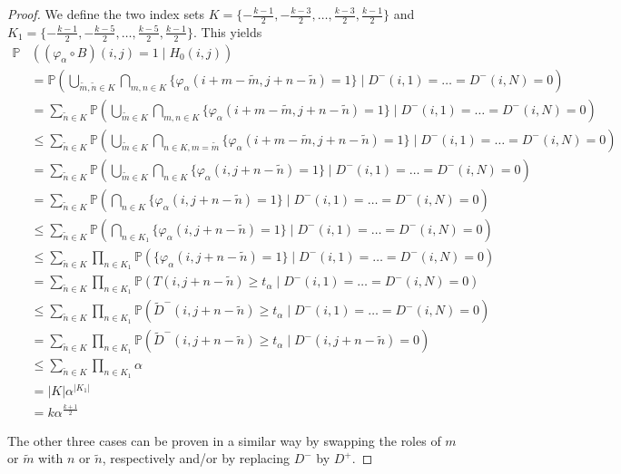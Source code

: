 \documentclass[a4paper,12pt]{article}
\newcommand{\abs}[1]{\lvert#1\rvert}
\theoremstyle{plain}
\theoremstyle{definition}
\theoremstyle{remark}
\begin{document}
\begin{proof}
	We define the two index sets $K = \{ -\frac{k - 1}{2}, -\frac{k - 3}{2}, \dots, \frac{k - 3}{2}, \frac{k - 1}{2} \}$ and $K_1 = \{ -\frac{k - 1}{2}, -\frac{k - 5}{2}, \dots, \frac{k - 5}{2}, \frac{k - 1}{2} \}$. This yields
	\begin{align*}
		\mathbb{P}&((\varphi_\alpha \circ B)(i, j) = 1 \mid H_0(i, j)) \\
		&= \mathbb{P} \left( \bigcup_{\tilde{m}, \tilde{n} \in K} \bigcap_{m, n \in K} \{ \varphi_\alpha(i + m - \tilde{m}, j + n - \tilde{n}) = 1 \} \mid D^-(i, 1) = \dots = D^-(i, N) = 0 \right) \\
		&= \sum_{\tilde{n} \in K} \mathbb{P} \left( \bigcup_{\tilde{m} \in K} \bigcap_{m, n \in K} \{ \varphi_\alpha(i + m - \tilde{m}, j + n - \tilde{n}) = 1 \} \mid D^-(i, 1) = \dots = D^-(i, N) = 0 \right) \\
		&\leq \sum_{\tilde{n} \in K} \mathbb{P} \left( \bigcup_{\tilde{m} \in K} \bigcap_{n \in K, m = \tilde{m}} \{ \varphi_\alpha(i + m - \tilde{m}, j + n - \tilde{n}) = 1 \} \mid D^-(i, 1) = \dots = D^-(i, N) = 0 \right) \\
		&= \sum_{\tilde{n} \in K} \mathbb{P} \left( \bigcup_{\tilde{m} \in K} \bigcap_{n \in K} \{ \varphi_\alpha(i, j + n - \tilde{n}) = 1 \} \mid D^-(i, 1) = \dots = D^-(i, N) = 0 \right) \\
		&= \sum_{\tilde{n} \in K} \mathbb{P} \left( \bigcap_{n \in K} \{ \varphi_\alpha(i, j + n - \tilde{n}) = 1 \} \mid D^-(i, 1) = \dots = D^-(i, N) = 0 \right) \\
		&\leq \sum_{\tilde{n} \in K} \mathbb{P} \left( \bigcap_{n \in K_1} \{ \varphi_\alpha(i, j + n - \tilde{n}) = 1 \} \mid D^-(i, 1) = \dots = D^-(i, N) = 0 \right) \\
		&\leq \sum_{\tilde{n} \in K} \prod_{n \in K_1} \mathbb{P} \left( \{ \varphi_\alpha(i, j + n - \tilde{n}) = 1 \} \mid D^-(i, 1) = \dots = D^-(i, N) = 0 \right) \\
		&= \sum_{\tilde{n} \in K} \prod_{n \in K_1} \mathbb{P} \left( T(i, j + n - \tilde{n}) \geq t_\alpha \mid D^-(i, 1) = \dots = D^-(i, N) = 0 \right) \\
		&\leq \sum_{\tilde{n} \in K} \prod_{n \in K_1} \mathbb{P} \left( \tilde{D}^-(i, j + n - \tilde{n}) \geq t_\alpha \mid D^-(i, 1) = \dots = D^-(i, N) = 0 \right) \\
		&= \sum_{\tilde{n} \in K} \prod_{n \in K_1} \mathbb{P} \left( \tilde{D}^-(i, j + n - \tilde{n}) \geq t_\alpha \mid D^-(i, j + n - \tilde{n}) = 0 \right) \\
		&\leq \sum_{\tilde{n} \in K} \prod_{n \in K_1} \alpha \\
		&= \abs{K} \alpha^{\abs{K_1}} \\
		&= k \alpha^{\frac{k+1}{2}}
	\end{align*}
	
	The other three cases can be proven in a similar way by swapping the roles of $m$ or $\tilde{m}$ with $n$ or $\tilde{n}$, respectively and/or by replacing $D^-$ by $D^+$.
\end{proof}
\end{document}
